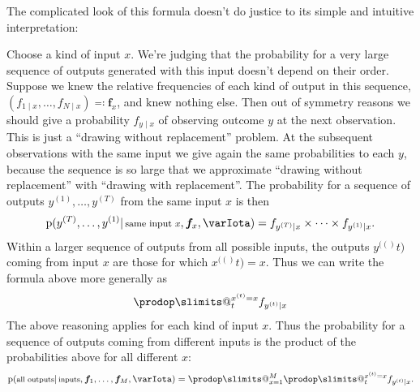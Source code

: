 \documentclass[\ifafour a4paper,12pt,\else a5paper,10pt,\fi%
onecolumn,oneside,article,%
british%
]{memoir}
\makeatletter
\theoremstyle{remark}
\theoremstyle{innote}
\def\prod{\DOTSI\prodop\slimits@}
\newcommand*{\defs}{\eqqcolon}
\newcommand*{\pf}{\mathrm{p}}%
\renewcommand*{\|}{\mathpunct{|}}
\newcommand*{\yI}{\varIota}
\newcommand*{\yf}{\bm{f}}
\newcommand*{\xo}[1]{x^{(#1)}}
\newcommand*{\yo}[1]{y^{(#1)}}
\makeatother
\begin{document}
The complicated look of this formula doesn't do justice to its simple and
intuitive interpretation:

Choose a kind of input $x$. We're judging that the probability for a very
large sequence of outputs generated with this input doesn't depend on their
order. Suppose we knew the relative frequencies of each kind of output in
this sequence, $(f_{1\|x},\dotsc,f_{N\|x}) \defs \yf_x$, and knew nothing
else. Then out of symmetry reasons we should give a probability $f_{y\|x}$
of observing outcome $y$ at the next observation. This is just a
\enquote{drawing without replacement} problem. At the subsequent
observations with the same input we give again the same probabilities to
each $y$, because the sequence is so large that we approximate
\enquote{drawing without replacement} with \enquote{drawing with
  replacement}. The probability for a sequence of outputs
$\yo{1},\dotsc,\yo{T}$ from the same input $x$ is then
\begin{equation}
  \pf(\yo{T}, \dotsc,\yo{1}\|\text{\footnotesize same input $x$},\yf_x, \yI) =
  f_{\yo{T}\|x}\times\dotsm\times f_{\yo{1}\|x}.
  \label{eq:input_m_indep_output}
\end{equation}
Within a larger sequence of outputs from all possible inputs, the outputs
$\yo(t)$ coming from input $x$ are those for which $\xo(t)=x$. Thus we can
write the formula above more generally as
\begin{equation}
 \prod_t^{\xo{t}=x} f_{\yo{t}\|x}
  \label{eq:input_m_indep_output_label_x}
\end{equation}
The above reasoning applies for each kind of input $x$. Thus the
probability for a sequence of outputs coming from different inputs is the
product of the probabilities above for all different $x$:
\begin{equation}
  \pf(\text{\footnotesize all outputs} \|\text{\footnotesize inputs}, \yf_1,\dotsc,\yf_M, \yI) =
\prod_{x=1}^M \prod_t^{\xo{t}=x} f_{\yo{t}\|x}.
  \label{eq:input_m_indep_output_all_x}
\end{equation}
\end{document}
